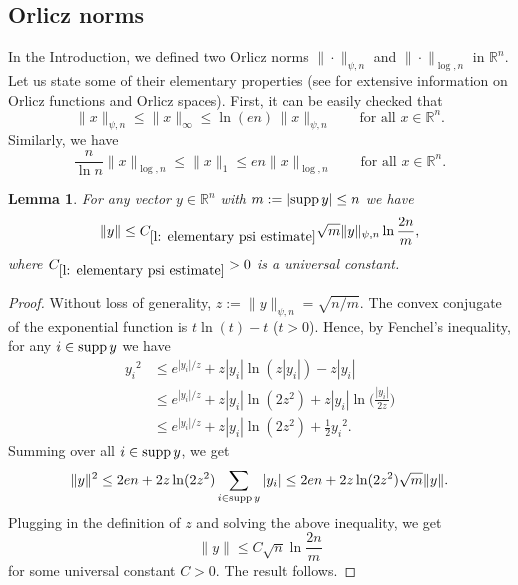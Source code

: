 \documentclass[12pt]{article}
\newtheorem{lemma}[theorem]{Lemma}
\theoremstyle{definition}
\theoremstyle{plain}
\newcommand{\R}{\mathbb{R}}
\newcommand{\supp}{{\rm supp\,}}
\begin{document}
\subsection{Orlicz norms}\label{s: Orlicz norms}

In the Introduction, we defined two Orlicz norms $\|\cdot\|_{\psi,n}$ and $\|\cdot\|_{\log,n}$ in $\R^n$.
Let us state some of their elementary properties (see \cite{RR}
for extensive information on Orlicz functions and Orlicz spaces).
First, it can be easily checked that
\begin{equation}\label{eq: psi infinity}
\|x\|_{\psi,n}\leq \|x\|_\infty\leq \ln(en)\,\|x\|_{\psi,n}\quad\quad\mbox{for all }x\in\R^n.
\end{equation}
Similarly, we have
\begin{equation}\label{eq: log 1}
\frac{n}{\ln n}\|x\|_{\log,n}\leq \|x\|_{1}\leq en\|x\|_{\log,n}\quad\quad\mbox{for all }x\in\R^n.
\end{equation}
\begin{lemma}\label{l: elementary psi estimate}
For any vector $y\in\R^n$ with $m:=|\supp y|\leq n$ we have
$$\|y\|\leq C_{\ref{l: elementary psi estimate}}\sqrt{m}\|y\|_{\psi,n}\ln\frac{2n}{m},$$
where $C_{\ref{l: elementary psi estimate}}>0$ is a universal constant.
\end{lemma}
\begin{proof}
Without loss of generality, $z:=\|y\|_{\psi,n}=\sqrt{n/m}$.
The convex conjugate of the exponential function is $t\ln(t)-t$ ($t>0$).
Hence, by Fenchel's inequality, for any $i\in\supp y$ we have
\begin{align*}
{y_i}^2&\leq e^{|y_i|/z}+z|y_i|\ln(z|y_i|)-z|y_i|\\
&\leq e^{|y_i|/z}+z|y_i|\ln(2z^2)+z|y_i|\ln\Big(\frac{|y_i|}{2z}\Big)\\
&\leq e^{|y_i|/z}+z|y_i|\ln(2z^2)+\frac{1}{2}{y_i}^2.
\end{align*}
Summing over all $i\in\supp y$, we get
$$\|y\|^2\leq 2en+2z\ln(2z^2)\sum_{i\in\supp y}|y_i|\leq 2en+2z\ln (2z^2)\sqrt{m}\|y\|.$$
Plugging in the definition of $z$ and solving the above inequality, we get
$$\|y\|\leq C\sqrt{n}\ln\frac{2n}{m}$$
for some universal constant $C>0$. The result follows.
\end{proof}
\end{document}
